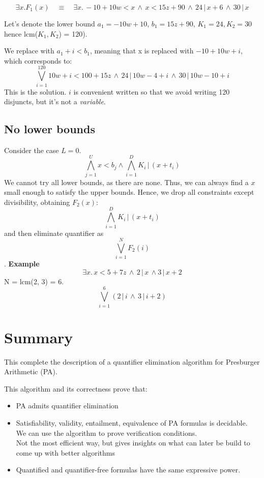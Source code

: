 \documentclass[11pt]{article}
\begin{document}
$$ \exists x. F_1(x) \quad \equiv \quad \exists x. \, -10 + 10w < x \, \land \, x < 15z + 90 \, \land \, 24 \, | \, x + 6 \, \land \, 30 \, | \, x$$

Let's denote the lower bound $a_1 = -10w + 10$, $b_1 = 15z + 90$, $K_1 = 24, K_2 = 30$ hence lcm($K_1, K_2$) = 120). 

We replace with $a_1 + i < b_1$, meaning that x is replaced with $-10 + 10w +i$, which corresponds to: 
\[
	\bigvee^{120}_{i=1} 10w + i < 100 + 15z \, \land \, 24 \, | \, 10w - 4 + i \, \land \, 30 \, | \, 10w - 10 + i
\]
This is the solution. $i$ is convenient written so that we avoid writing 120 disjuncts, but it's not a \textit{variable}. 

\subsection*{No lower bounds}

Consider the case $L = 0$. $$ \bigwedge^{U}_{j=1} x < b_j \land \bigwedge^{D}_{i=1} K_i \, | \, (x + t_i)$$ We cannot try all lower bounds, as there are none. Thus, we can always find a $x$ small enough to satisfy the upper bounds. Hence, we drop all constraints except divisibility, obtaining $F_2(x)$: $$\bigwedge^{D}_{i=1} K_i \, | \, (x + t_i)$$ and then eliminate quantifier as $$\bigvee^{N}_{i=1} F_2(i)$$. \textbf{Example} $$\exists x. \, x < 5 + 7z \, \land \, 2 \, | \, x \, \land 3 \, | \, x + 2$$ N = lcm(2, 3) = 6. $$\bigvee^{6}_{i=1} (2 \, | \, i \, \land \,  3 \, | \, i + 2)$$

\section*{Summary}

This complete the description of a quantifier elimination algorithm for Presburger Arithmetic (PA). 

This algorithm and its correctness prove that: 
\begin{itemize}
	\item PA admits quantifier elimination
	\item Satisfiability, validity, entailment, equivalence of PA formulas is decidable. \\
	We can use the algorithm to prove verification conditions. \\
	Not the most efficient way, but gives insights on what can later be build to come up with better algorithms
	\item Quantified and quantifier-free formulas have the same expressive power. 
\end{itemize}
\end{document}

